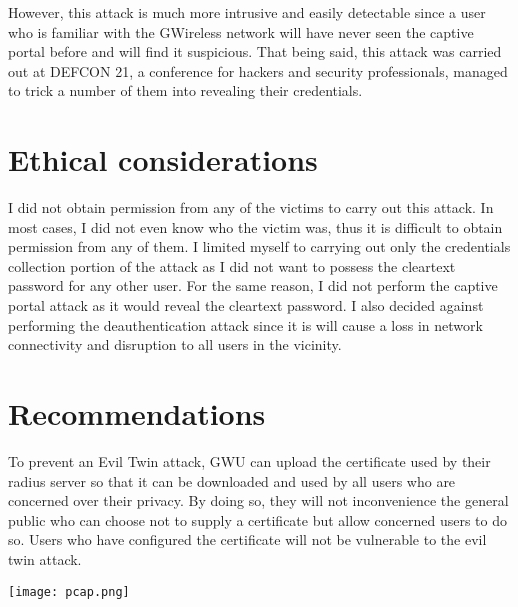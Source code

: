 \documentclass[twoside]{article}
\begin{document}
\begin{multicols}{2}
However, this attack is much more intrusive and easily detectable since a user who is familiar with the GWireless network will have never seen the captive portal before and will find it suspicious. That being said, this attack\cite{8} was carried out at DEFCON 21, a conference for hackers and security professionals, managed to trick a number of them into revealing their credentials.





\section{Ethical considerations}

I did not obtain permission from any of the victims to carry out this attack. In most cases, I did not even know who the victim was, thus it is difficult to obtain permission from any of them. I limited myself to carrying out only the credentials collection portion of the attack as I did not want to possess the cleartext password for any other user. For the same reason, I did not perform the captive portal attack as it would reveal the cleartext password. I also decided against performing the deauthentication attack since it is will cause a loss in network connectivity and disruption to all users in the vicinity.



\section{Recommendations}

To prevent an Evil Twin attack, GWU can upload the certificate used by their radius server so that it can be downloaded and used by all users who are concerned over their privacy. By doing so, they will not inconvenience the general public who can choose not to supply a certificate but allow concerned users to do so. Users who have configured the certificate will not be vulnerable to the evil twin attack.


\end{multicols}
\texttt{[image: pcap.png]}
\end{document}
